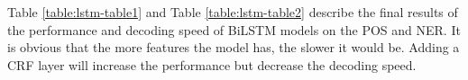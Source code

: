 Table \ref{table:lstm-table1} and Table \ref{table:lstm-table2} describe the final results of the performance and decoding speed of BiLSTM models on the POS and NER. It is obvious that the more features the model has, the slower it would be. Adding a CRF layer will increase the performance but decrease the decoding speed. 

